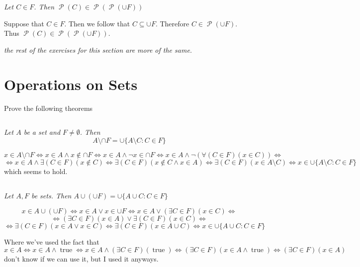 \documentclass[11pt,oneside,titlepage]{book}
\DeclareMathOperator \pow {\mathcal {P}}
\DeclareMathOperator \lra {\Leftrightarrow}
\DeclareMathOperator \true {true}
\begin{document}
\textit{Let $C \in F$. Then $\pow(C) \in \pow(\pow(\cup F))$}

Suppose that $C \in F$. Then we follow that $C \subseteq \cup F$. Therefore $C \in \pow (\cup F)$.
Thus $\pow(C) \in \pow(\pow (\cup F))$.


\textit{the rest of the exercises for this section are more of the same.}

\section{Operations on Sets}

Prove the following theorems

\subsection{}

\textit{Let $A$ be a set and $F \neq \emptyset$. Then}
$$A \setminus \cap F = \cup\{A \setminus C: C \in F\}$$

$$x \in A \setminus \cap F \lra
x \in A \land x \notin \cap F \lra
x \in A \land \neg x \in \cap F \lra
x \in A \land \neg (\forall(C \in F)(x \in C)) \lra
$$
$$ \lra
x \in A \land \exists(C \in F)(x \notin C) \lra
\exists(C \in F)(x \notin C \land x \in A) \lra
\exists(C \in F)(x \in A \setminus C) \lra
x \in \cup\{A \setminus C: C \in F\}
$$
which seems to hold.

\subsection{}

\textit{Let $A, F$ be sets. Then $A \cup (\cup F) = \cup\{A \cup C: C \in F\}$}

$$x \in A \cup (\cup F) \lra x \in A \lor x \in \cup F \lra
x \in A \lor  (\exists C \in F)(x \in C) \lra$$
$$
\lra (\exists C \in F)(x \in A) \lor \exists(C \in F)( x \in C) \lra
$$
$$ \lra 
\exists(C \in F)(x \in A \lor x \in C) \lra
\exists(C \in F)(x \in A \cup C) \lra x \in \cup\{A \cup C: C \in F\}
$$

Where we've used the fact that
$$x \in A \lra x \in A \land \true \lra x \in A \land (\exists C \in F)(\true) \lra
(\exists C \in F)(x \in A  \land \true) \lra  (\exists C \in F)(x \in A)$$
don't know if we can use it, but I used it anyways.




\subsection{}
\end{document}
